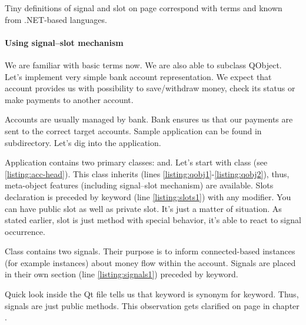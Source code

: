 \begin{fdocextra}
Tiny definitions of signal and slot on page \pageref{desc:sig} correspond with terms  and  known from .NET-based languages. \citep[p.~200-202]{nigel:csharp}
\end{fdocextra}

\paragraph{Using signal--slot mechanism}
We are familiar with basic terms now. We are also able to subclass QObject. Let's implement very simple bank account representation. We expect that account provides us with possibility to save/withdraw money, check its status or make payments to another account.

Accounts are usually managed by bank. Bank ensures us that our payments are sent to the correct target accounts. Sample application can be found in subdirectory. Let's dig into the application.

Application contains two primary classes: and. Let's start with class (see \autoref{listing:acc-head}). This class inherits (lines \ref{listing:qobj1}-\ref{listing:qobj2}), thus, meta-object features (including signal--slot mechanism) are available. Slots declaration is preceded by keyword (line \ref{listing:slots1}) with any modifier. You can have public slot as well as private slot. It's just a matter of situation. As stated earlier, slot is just method with special behavior, it's able to react to signal occurrence.

Class  contains two signals. Their purpose is to inform connected-based instances (for example instances) about money flow within the account. Signals are placed in their own section (line \ref{listing:signals1}) preceded by keyword.

\begin{fdocextra}
Quick look inside the Qt file tells us that keyword is synonym for keyword. Thus, signals are just public methods. This observation gets clarified on page \pageref{section:mocfun} in chapter .
\end{fdocextra}

